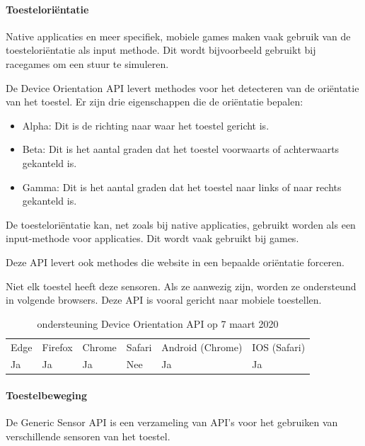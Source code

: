 \paragraph{Toesteloriëntatie }

Native applicaties en meer specifiek, mobiele games maken vaak gebruik van de toesteloriëntatie als input methode. Dit wordt bijvoorbeeld gebruikt bij racegames om een stuur te simuleren.

De Device Orientation API \autocite{Tibbett2019} levert methodes voor het detecteren van de oriëntatie van het toestel. Er zijn drie eigenschappen die de oriëntatie bepalen:


 \begin{itemize}
	\item	Alpha:  Dit is de richting naar waar het toestel gericht is.
	\item	Beta:  Dit is het aantal graden dat het toestel voorwaarts of achterwaarts gekanteld is.
	\item   Gamma: Dit is het aantal graden dat het toestel naar links of naar rechts gekanteld is.
\end{itemize}


De toesteloriëntatie kan, net zoals bij native applicaties, gebruikt worden als een input-methode voor applicaties. Dit wordt vaak gebruikt bij games.

Deze API levert ook methodes die website in een bepaalde oriëntatie forceren.

Niet elk toestel heeft deze sensoren. Als ze aanwezig zijn, worden ze ondersteund in volgende browsers. Deze API is vooral gericht naar mobiele toestellen. 

\begin{table}[H]
	\centering
	\begin{tabular}{llllll}
		Edge & Firefox & Chrome & Safari & Android (Chrome) & IOS (Safari) \\
		Ja   & Ja      &  Ja   & Nee     & Ja               & Ja          
	\end{tabular}	
	\caption{ondersteuning Device Orientation API op 7 maart 2020}
\end{table}

\paragraph{Toestelbeweging}
De Generic Sensor API \autocite{Waldroon2019} is een verzameling van API’s voor het gebruiken van verschillende sensoren van het toestel.

